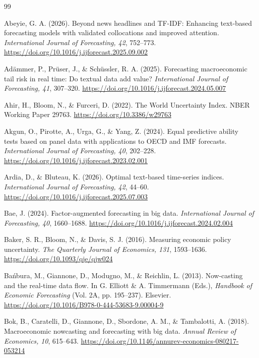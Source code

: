 \documentclass[preprint,12pt,authoryear]{elsarticle}
\begin{document}
\begingroup
\small
\setlength{\bibsep}{0pt plus 0.2ex}
\begin{thebibliography}{99}

Abeyie, G. A. (2026). Beyond news headlines and TF-IDF: Enhancing text-based
forecasting models with validated collocations and improved attention.
\emph{International Journal of Forecasting, 42}, 752--773.
\url{https://doi.org/10.1016/j.ijforecast.2025.09.002}

Ad{\"a}mmer, P., Pr{\"u}ser, J., \& Sch{\"u}ssler, R. A. (2025). Forecasting
macroeconomic tail risk in real time: Do textual data add value?
\emph{International Journal of Forecasting, 41}, 307--320.
\url{https://doi.org/10.1016/j.ijforecast.2024.05.007}

Ahir, H., Bloom, N., \& Furceri, D. (2022). The World Uncertainty Index.
NBER Working Paper 29763. \url{https://doi.org/10.3386/w29763}

Akgun, O., Pirotte, A., Urga, G., \& Yang, Z. (2024). Equal predictive ability
tests based on panel data with applications to OECD and IMF forecasts.
\emph{International Journal of Forecasting, 40}, 202--228.
\url{https://doi.org/10.1016/j.ijforecast.2023.02.001}

Ardia, D., \& Bluteau, K. (2026). Optimal text-based time-series indices.
\emph{International Journal of Forecasting, 42}, 44--60.
\url{https://doi.org/10.1016/j.ijforecast.2025.07.003}

Bae, J. (2024). Factor-augmented forecasting in big data.
\emph{International Journal of Forecasting, 40}, 1660--1688.
\url{https://doi.org/10.1016/j.ijforecast.2024.02.004}

Baker, S. R., Bloom, N., \& Davis, S. J. (2016). Measuring economic policy
uncertainty. \emph{The Quarterly Journal of Economics, 131}, 1593--1636.
\url{https://doi.org/10.1093/qje/qjw024}

Ba{\'n}bura, M., Giannone, D., Modugno, M., \& Reichlin, L. (2013).
Now-casting and the real-time data flow. In G. Elliott \& A. Timmermann
(Eds.), \emph{Handbook of Economic Forecasting} (Vol. 2A, pp. 195--237).
Elsevier. \url{https://doi.org/10.1016/B978-0-444-53683-9.00004-9}

Bok, B., Caratelli, D., Giannone, D., Sbordone, A. M., \& Tambalotti, A.
(2018). Macroeconomic nowcasting and forecasting with big data. \emph{Annual
Review of Economics, 10}, 615--643.
\url{https://doi.org/10.1146/annurev-economics-080217-053214}


\end{thebibliography}
\end{document}
